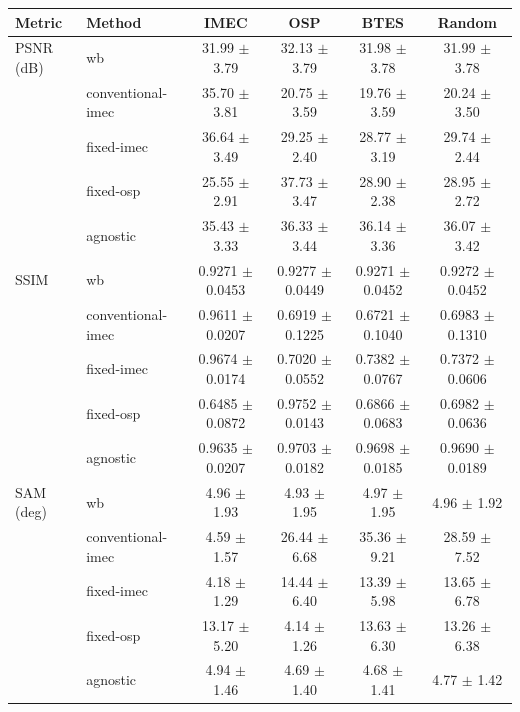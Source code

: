 \begin{tabular}{llcccc}
\hline
Metric & Method & IMEC & OSP & BTES & Random \\
\hline
PSNR (dB) & wb & 31.99 $\pm$ 3.79 & 32.13 $\pm$ 3.79 & 31.98 $\pm$ 3.78 & 31.99 $\pm$ 3.78 \\
 & conventional-imec & 35.70 $\pm$ 3.81 & 20.75 $\pm$ 3.59 & 19.76 $\pm$ 3.59 & 20.24 $\pm$ 3.50 \\
 & fixed-imec & 36.64 $\pm$ 3.49 & 29.25 $\pm$ 2.40 & 28.77 $\pm$ 3.19 & 29.74 $\pm$ 2.44 \\
 & fixed-osp & 25.55 $\pm$ 2.91 & 37.73 $\pm$ 3.47 & 28.90 $\pm$ 2.38 & 28.95 $\pm$ 2.72 \\
 & agnostic & 35.43 $\pm$ 3.33 & 36.33 $\pm$ 3.44 & 36.14 $\pm$ 3.36 & 36.07 $\pm$ 3.42 \\
\hline
SSIM & wb & 0.9271 $\pm$ 0.0453 & 0.9277 $\pm$ 0.0449 & 0.9271 $\pm$ 0.0452 & 0.9272 $\pm$ 0.0452 \\
 & conventional-imec & 0.9611 $\pm$ 0.0207 & 0.6919 $\pm$ 0.1225 & 0.6721 $\pm$ 0.1040 & 0.6983 $\pm$ 0.1310 \\
 & fixed-imec & 0.9674 $\pm$ 0.0174 & 0.7020 $\pm$ 0.0552 & 0.7382 $\pm$ 0.0767 & 0.7372 $\pm$ 0.0606 \\
 & fixed-osp & 0.6485 $\pm$ 0.0872 & 0.9752 $\pm$ 0.0143 & 0.6866 $\pm$ 0.0683 & 0.6982 $\pm$ 0.0636 \\
 & agnostic & 0.9635 $\pm$ 0.0207 & 0.9703 $\pm$ 0.0182 & 0.9698 $\pm$ 0.0185 & 0.9690 $\pm$ 0.0189 \\
\hline
SAM (deg) & wb & 4.96 $\pm$ 1.93 & 4.93 $\pm$ 1.95 & 4.97 $\pm$ 1.95 & 4.96 $\pm$ 1.92 \\
 & conventional-imec & 4.59 $\pm$ 1.57 & 26.44 $\pm$ 6.68 & 35.36 $\pm$ 9.21 & 28.59 $\pm$ 7.52 \\
 & fixed-imec & 4.18 $\pm$ 1.29 & 14.44 $\pm$ 6.40 & 13.39 $\pm$ 5.98 & 13.65 $\pm$ 6.78 \\
 & fixed-osp & 13.17 $\pm$ 5.20 & 4.14 $\pm$ 1.26 & 13.63 $\pm$ 6.30 & 13.26 $\pm$ 6.38 \\
 & agnostic & 4.94 $\pm$ 1.46 & 4.69 $\pm$ 1.40 & 4.68 $\pm$ 1.41 & 4.77 $\pm$ 1.42 \\
\hline
\end{tabular}
